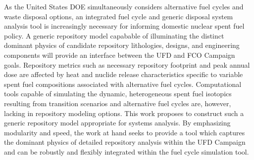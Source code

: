 As the United States \gls{DOE} simultaneously considers alternative fuel cycles 
and waste disposal options, an integrated fuel cycle and generic disposal system 
analysis tool is increasingly necessary for informing domestic nuclear spent 
fuel policy. A generic repository model capabable of illuminating the distinct 
dominant physics of candidate repository lithologies, designs, and engineering 
components will provide an interface between the \gls{UFD} and \gls{FCO} Campaign 
goals. Repository metrics such as necessary repository footprint and peak annual 
dose are affected by heat and nuclide release characteristics specific to 
variable spent fuel compositions associated  with alternative fuel cycles. 
Computational tools capable of simulating the dynamic, heterogeneous spent fuel 
isotopics resulting from transition scenarios and alternative fuel cycles 
are, however, lacking in repository modeling  options. This work proposes to 
construct such a generic repository model appropriate for systems analysis. By 
emphasizing modularity and speed, the work at hand seeks to  provide a tool 
which captures the dominant physics of detailed repository analysis within the 
\gls{UFD} Campaign and can be robustly and flexibly integrated within the 
\Cyclus fuel cycle simulation tool.

\glsresetall
